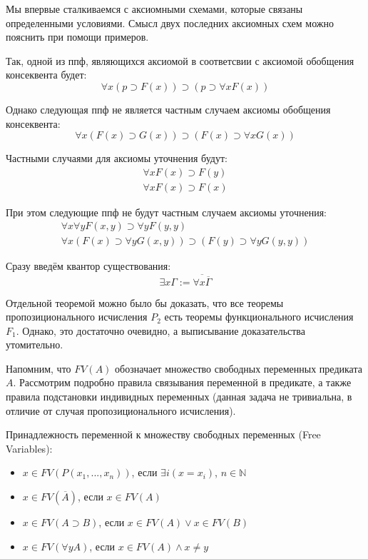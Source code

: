 Мы впервые сталкиваемся с аксиомными схемами, которые связаны определенными условиями.
Смысл двух последних аксиомных схем можно пояснить при помощи примеров.

Так, одной из ппф, являющихся аксиомой в соответсвии с аксиомой обобщения консеквента будет:
\begin{equation*}
    \forall x (p \supset F(x)) \supset (p \supset \forall x F(x))
\end{equation*}

Однако следующая ппф не является частным случаем аксиомы обобщения консеквента:
\begin{equation*}
    \forall x (F(x) \supset G(x)) \supset (F(x) \supset \forall x G(x))
\end{equation*}

Частными случаями для аксиомы уточнения будут:
\begin{gather*}
    \forall x F(x) \supset F(y) \\
    \forall x F(x) \supset F(x)
\end{gather*}

При этом следующие ппф не будут частным случаем аксиомы уточнения:
\begin{gather*}
    \forall x \forall y F(x, y) \supset \forall y F(y, y) \\
    \forall x (F(x) \supset \forall y G(x, y)) \supset (F(y) \supset \forall y G(y, y))
\end{gather*}

Сразу введём квантор существования:
\begin{equation*}
    \exists x \Gamma := \overline{\forall x \overline{\Gamma}}
\end{equation*}

\begin{remark}
    Отдельной теоремой можно было бы доказать, что все теоремы пропозиционального исчисления $P_2$ есть теоремы функционального исчисления $F_1$. Однако, это достаточно очевидно, а выписывание доказательства утомительно.
\end{remark}

Напомним, что $FV(A)$ обозначает множество свободных переменных предиката $A$. Рассмотрим подробно правила связывания переменной в предикате, а также правила подстановки индивидных переменных (данная задача не тривиальна, в отличие от случая пропозиционального исчисления).

Принадлежность переменной к множеству свободных переменных (Free Variables):
\begin{itemize}
    \item $x\in FV(P(x_1,...,x_n))$, если $\exists i (x=x_i)$, $n\in \mathbb{N}$
    \item $x\in FV(\overline{A})$, если $x \in FV(A)$
    \item $x \in FV(A\supset B)$, если $x\in FV(A) \lor x\in FV(B)$
    \item $x \in FV(\forall y A)$, если $x\in FV(A) \land x\ne y$
\end{itemize}

